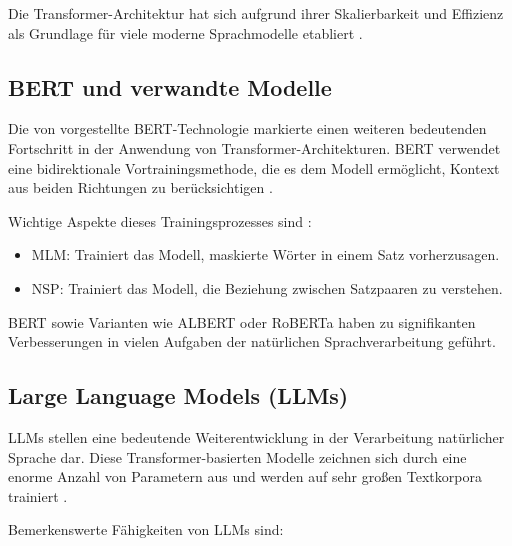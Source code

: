 Die Transformer-Architektur hat sich aufgrund ihrer Skalierbarkeit und Effizienz als Grundlage für viele moderne Sprachmodelle etabliert \parencite{VaswaniAshish2023AIAY}.

\subsection{BERT und verwandte Modelle}
\label{subsec:bert-und-verwandte-modelle}

Die von \textcite{DevlinJacob2019BPoD} vorgestellte \gls{BERT}-Technologie markierte einen weiteren bedeutenden Fortschritt in der Anwendung von Transformer-Architekturen. BERT verwendet eine bidirektionale Vortrainingsmethode, die es dem Modell ermöglicht, Kontext aus beiden Richtungen zu berücksichtigen \parencite{DevlinJacob2019BPoD}.

Wichtige Aspekte dieses Trainingsprozesses sind \parencite{DevlinJacob2019BPoD}:

\begin{itemize}
	\item \gls{MLM}: Trainiert das Modell, maskierte Wörter in einem Satz vorherzusagen.
	\item \gls{NSP}: Trainiert das Modell, die Beziehung zwischen Satzpaaren zu verstehen.
\end{itemize}

\gls{BERT} \parencite{DevlinJacob2019BPoD} sowie Varianten wie ALBERT \parencite{LanZhenzhong2019AALB} oder RoBERTa \parencite{liu2019robertarobustlyoptimizedbert} haben zu signifikanten Verbesserungen in vielen Aufgaben der natürlichen Sprachverarbeitung geführt.

\subsection{Large Language Models (LLMs)}
\label{subsec:llms}

\glspl{LLM} stellen eine bedeutende Weiterentwicklung in der Verarbeitung natürlicher Sprache dar. Diese Transformer-basierten Modelle zeichnen sich durch eine enorme Anzahl von Parametern aus und werden auf sehr großen Textkorpora trainiert \parencite{VaswaniAshish2023AIAY}.

Bemerkenswerte Fähigkeiten von \glspl{LLM} sind:

